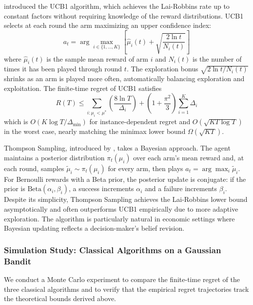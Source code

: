 \citet{auer2002} introduced the UCB1 algorithm, which achieves the Lai-Robbins rate up to constant factors without requiring knowledge of the reward distributions. UCB1 selects at each round the arm maximizing an upper confidence index:
\begin{equation}
a_t = \arg\max_{i \in \{1, \ldots, K\}} \left[\hat{\mu}_i(t) + \sqrt{\frac{2 \ln t}{N_i(t)}}\right]
\label{eq:ucb1}
\end{equation}
where $\hat{\mu}_i(t)$ is the sample mean reward of arm $i$ and $N_i(t)$ is the number of times it has been played through round $t$. The exploration bonus $\sqrt{2 \ln t / N_i(t)}$ shrinks as an arm is played more often, automatically balancing exploration and exploitation. The finite-time regret of UCB1 satisfies
\begin{equation}
R(T) \leq \sum_{i : \mu_i < \mu^*} \left(\frac{8 \ln T}{\Delta_i}\right) + \left(1 + \frac{\pi^2}{3}\right) \sum_{i=1}^{K} \Delta_i
\label{eq:ucb1_regret}
\end{equation}
which is $O(K \log T / \Delta_{\min})$ for instance-dependent regret and $O(\sqrt{KT \log T})$ in the worst case, nearly matching the minimax lower bound $\Omega(\sqrt{KT})$.

Thompson Sampling, introduced by \citet{Thompson1933}, takes a Bayesian approach. The agent maintains a posterior distribution $\pi_t(\mu_i)$ over each arm's mean reward and, at each round, samples $\tilde{\mu}_i \sim \pi_t(\mu_i)$ for every arm, then plays $a_t = \arg\max_i \tilde{\mu}_i$. For Bernoulli rewards with a Beta prior, the posterior update is conjugate: if the prior is $\text{Beta}(\alpha_i, \beta_i)$, a success increments $\alpha_i$ and a failure increments $\beta_i$. Despite its simplicity, Thompson Sampling achieves the Lai-Robbins lower bound asymptotically \citep{auer2002} and often outperforms UCB1 empirically due to more adaptive exploration. The algorithm is particularly natural in economic settings where Bayesian updating reflects a decision-maker's belief revision.

\subsubsection{Simulation Study: Classical Algorithms on a Gaussian Bandit}
\label{sec:sim_fundamentals}

We conduct a Monte Carlo experiment to compare the finite-time regret of the three classical algorithms and to verify that the empirical regret trajectories track the theoretical bounds derived above.

